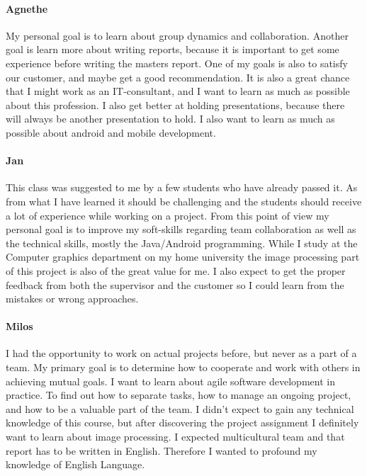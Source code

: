\paragraph{Agnethe}

My personal goal is to learn about group dynamics and collaboration. Another goal is learn more about writing reports, because it is important to get some experience before writing the masters report. One of my goals is also to  satisfy our customer, and maybe get a good recommendation. It is also a great chance that I might work as an IT-consultant, and I want to learn as much as possible about this profession. I also  get better at holding presentations, because there will always be another presentation to hold. I also want to learn as much as possible about android and mobile development.

\paragraph{Jan}

This class was suggested to me by a few students who have already passed it. As from what I have learned it should be challenging and the students should receive a lot of experience while working on a project. From this point of view my personal goal is to improve my soft-skills regarding team collaboration as well as the technical skills, mostly the Java/Android programming. While I study at the Computer graphics department on my home university the image processing part of this project is also of the great value for me. I also expect to get the proper feedback from both the supervisor and the customer so I could learn from the mistakes or wrong approaches.

\paragraph{Milos}

I had the opportunity to work on actual projects before, but never as a part of a team. 
My primary goal is to determine how to cooperate and work with others in achieving mutual goals.
I want to learn about agile software development in practice.
To find out how to separate tasks, how to manage an ongoing project, and how to be a valuable part of the team.
I didn't expect to gain any technical knowledge of this course, but after discovering the project assignment I definitely want to learn about image processing.
I expected multicultural team and that report has to be written in English.
Therefore I wanted to profound my knowledge of English Language.

